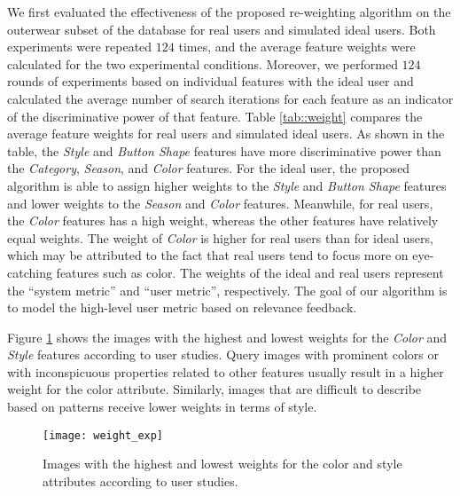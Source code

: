 \documentclass[journal]{IEEEtran}
\begin{document}
We first evaluated the effectiveness of the proposed re-weighting algorithm on the outerwear subset of the database for real users and simulated ideal users. Both experiments were repeated $124$ times, and the average feature weights were calculated for the two experimental conditions. Moreover, we performed $124$ rounds of experiments based on individual features with the ideal user and calculated the average number of search iterations for each feature as an indicator of the discriminative power of that feature. Table \ref{tab::weight} compares the average feature weights for real users and simulated ideal users. As shown in the table, the {\em Style} and {\em Button Shape} features have more discriminative power than  the {\em Category}, {\em Season}, and {\em Color} features.
For the ideal user, the proposed algorithm is able to assign higher weights to the {\em Style} and {\em Button Shape} features and lower weights to the {\em Season} and {\em Color} features.
Meanwhile, for real users, the {\em Color} features has a high weight, whereas the other features have relatively equal weights. The weight of {\em Color} is higher for real users than for ideal users, which may be attributed to the fact that real users tend to focus more on eye-catching features such as color. The weights of the ideal and real users represent the ``system metric'' and ``user metric'', respectively. The goal of our algorithm is to model the high-level user metric based on relevance feedback. %

Figure \ref{fig::bias} shows the images with the highest and lowest weights for the {\em Color} and {\em Style} features according to user studies. Query images with prominent colors or with inconspicuous properties related to other features usually result in a higher weight for the color attribute. Similarly, images that are difficult to describe based on patterns receive lower weights in terms of style.


\begin{figure}[t]
\centering
\texttt{[image: weight\_exp]}
\caption{Images with the highest and lowest weights for the color and style attributes according to user studies.}
\label{fig::bias}
\end{figure}
\end{document}
